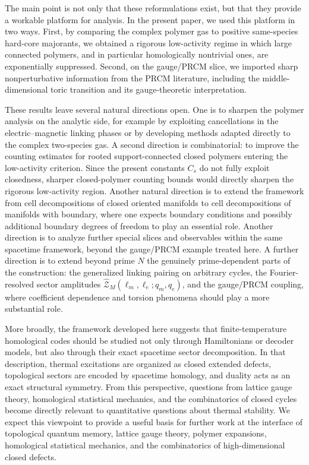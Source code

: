 The main point is not only that these reformulations exist, but that they
provide a workable platform for analysis.  In the present paper, we used this
platform in two ways.  First, by comparing the complex polymer gas to positive
same-species hard-core majorants, we obtained a rigorous low-activity regime in
which large connected polymers, and in particular homologically nontrivial
ones, are exponentially suppressed.  Second, on the gauge/PRCM slice, we
imported sharp nonperturbative information from the PRCM literature, including
the middle-dimensional toric transition and its gauge-theoretic interpretation.

These results leave several natural directions open. One is to sharpen the polymer analysis on the analytic side, for example by exploiting cancellations in the electric--magnetic linking phases or by developing methods adapted directly to the complex two-species gas. A second direction is combinatorial: to improve the counting estimates for rooted support-connected closed polymers entering the low-activity criterion. Since the present constants \(C_s\) do not fully exploit closedness, sharper closed-polymer counting bounds would directly sharpen the rigorous low-activity region. Another natural direction is to extend the framework from cell decompositions of closed oriented manifolds to cell decompositions of manifolds with boundary, where one expects boundary conditions and possibly additional boundary degrees of freedom to play an essential role. Another direction is to analyze further special slices and observables within the same spacetime framework, beyond the gauge/PRCM example treated here. A further direction is to extend beyond prime \(N\) the genuinely prime-dependent parts of the construction: the generalized linking pairing on arbitrary cycles, the Fourier-resolved sector amplitudes \(\widehat{\mathcal Z}_M(\ell_m,\ell_e;q_m,q_e)\), and the gauge/PRCM coupling, where coefficient dependence and torsion phenomena should play a more substantial role.

More broadly, the framework developed here suggests that finite-temperature
homological codes should be studied not only through Hamiltonians or decoder
models, but also through their exact spacetime sector decomposition.  In that
description, thermal excitations are organized as closed extended defects,
topological sectors are encoded by spacetime homology, and duality acts as an
exact structural symmetry.  From this perspective, questions from lattice gauge
theory, homological statistical mechanics, and the combinatorics of closed
cycles become directly relevant to quantitative questions about thermal
stability.  We expect this viewpoint to provide a useful basis for further work
at the interface of topological quantum memory, lattice gauge theory, polymer
expansions, homological statistical mechanics, and the combinatorics of
high-dimensional closed defects.






